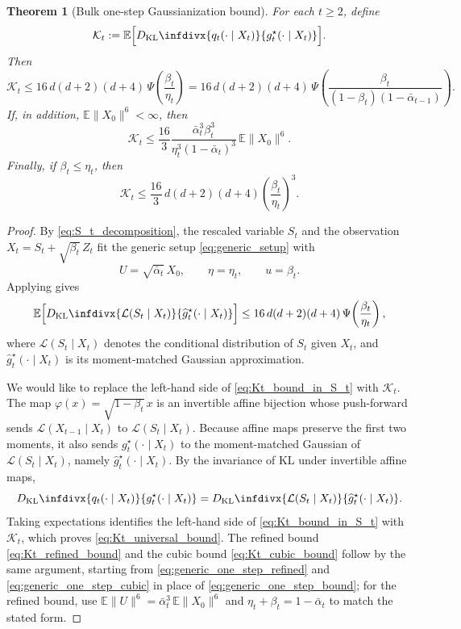 \documentclass[11pt]{article}
\def\E{\mathbb{E}}
\newcommand{\kl}{D_{\mathrm{KL}}\infdivx}
\newcommand{\norm}[1]{\|#1\|}
\newcommand{\PsiFn}{\Psi}
\newcommand{\Law}{\mathcal{L}}
\newtheorem{thm}{Theorem}
\begin{document}
\begin{thm}[Bulk one-step Gaussianization bound]
\label{thm:bulk_one_step_bound}
For each \(t\ge 2\), define
\[
\mathcal K_t
:=
\E\Big[
\kl{q_t(\cdot\mid X_t)}{g_t^\star(\cdot\mid X_t)}
\Big].
\]
Then
\begin{equation}
\label{eq:Kt_universal_bound}
\mathcal K_t
\le
16\,d(d+2)(d+4)
\,\PsiFn\!\left(\frac{\beta_t}{\eta_t}\right)
=
16\,d(d+2)(d+4)
\,\PsiFn\!\left(
\frac{\beta_t}{(1-\beta_t)(1-\bar\alpha_{t-1})}
\right).
\end{equation}
If, in addition, \(\E\norm{X_0}^6<\infty\), then
\begin{equation}
\label{eq:Kt_refined_bound}
\mathcal K_t
\le
\frac{16}{3}
\frac{\bar\alpha_t^3\beta_t^3}{\eta_t^3(1-\bar\alpha_t)^3}
\,\E\norm{X_0}^6.
\end{equation}
Finally, if \(\beta_t\le \eta_t\), then
\begin{equation}
\label{eq:Kt_cubic_bound}
\mathcal K_t
\le
\frac{16}{3}\,d(d+2)(d+4)
\left(\frac{\beta_t}{\eta_t}\right)^3.
\end{equation}
\end{thm}

\begin{proof}
By \eqref{eq:S_t_decomposition}, the rescaled variable \(S_t\) and the observation \(X_t = S_t+\sqrt{\beta_t}\,Z_t\) fit the generic setup \eqref{eq:generic_setup} with 
\[
U=\sqrt{\bar\alpha_t}\,X_0,\qquad \eta=\eta_t,\qquad u=\beta_t.
\]
Applying  gives
\begin{equation}
\label{eq:Kt_bound_in_S_t}
\E\Big[\kl{\Law(S_t\mid X_t)}{\widehat g_t^\star(\cdot\mid X_t)}\Big]
\le
16\,d(d+2)(d+4)\,\PsiFn\!\left(\frac{\beta_t}{\eta_t}\right),
\end{equation}
where \(\Law(S_t\mid X_t)\) denotes the conditional distribution of \(S_t\) given \(X_t\), and \(\widehat g_t^\star(\cdot\mid X_t)\) is its moment-matched Gaussian approximation.

We would like to replace the left-hand side of \eqref{eq:Kt_bound_in_S_t} with \(\mathcal K_t\). The map \(\varphi(x)=\sqrt{1-\beta_t}\,x\) is an invertible affine bijection whose push-forward sends \(\Law(X_{t-1}\mid X_t)\) to \(\Law(S_t\mid X_t)\). Because affine maps preserve the first two moments, it also sends \(g_t^\star(\cdot\mid X_t)\) to the moment-matched Gaussian of \(\Law(S_t\mid X_t)\), namely \(\widehat g_t^\star(\cdot\mid X_t)\). By the invariance of KL under invertible affine maps,
\[
\kl{q_t(\cdot\mid X_t)}{g_t^\star(\cdot\mid X_t)}
=
\kl{\Law(S_t\mid X_t)}{\widehat g_t^\star(\cdot\mid X_t)}.
\]
Taking expectations identifies the left-hand side of \eqref{eq:Kt_bound_in_S_t} with \(\mathcal K_t\), which proves \eqref{eq:Kt_universal_bound}. The refined bound \eqref{eq:Kt_refined_bound} and the cubic bound \eqref{eq:Kt_cubic_bound} follow by the same argument, starting from \eqref{eq:generic_one_step_refined} and \eqref{eq:generic_one_step_cubic} in place of \eqref{eq:generic_one_step_bound}; for the refined bound, use \(\E\norm{U}^6=\bar\alpha_t^3\,\E\norm{X_0}^6\) and \(\eta_t+\beta_t=1-\bar\alpha_t\) to match the stated form.

\end{proof}
\end{document}
